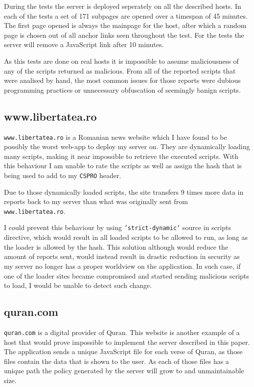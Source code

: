 \begin{description}
During the tests the server is deployed seperately on all the described hosts.
In each of the tests a set of 171 subpages are opened over a timespan of 45 minutes. 
The first page opened is always the mainpage for the host, after which a random page is chosen out of all anchor links seen throughout the test.
For the tests the server will remove a JavaScript link after 10 minutes.

As this tests are done on real hosts it is impossible to assume maliciousness of any of the scripts returned as malicious.
From all of the reported scripts that were analised by hand, the most common issues for those reports were dubious programming practices or unnecessary obfuscation of seemingly banign scripts.



\subsection{www.libertatea.ro}

\texttt{www.libertatea.ro} is a Romanian news website which I have found to be possibly the worst web-app to deploy my server on.
They are dynamically loading many scripts, making it near impossible to retrieve the executed scripts.
With this behaviour I am unable to rate the scripts as well as assign the hash that is being used to add to my \texttt{CSPRO} header.

Due to those dynamically loaded scripts, the site transfers 9 times more data in reports back to my server than what was originally sent from \texttt{www.libertatea.ro}.

I could prevent this behaviour by using \texttt{'strict-dynamic'} source in scripts directive, which would result in all loaded scripts to be allowed to run, as long as the loader is allowed by the hash.
This solution although would reduce the amount of reports sent, would instead result in drastic reduction in security as my server no longer has a proper worldview on the application.
In such case, if one of the loader sites became compromised and started sending malicious scripts to load, I would be unable to detect such change.

\subsection{quran.com}

\texttt{quran.com} is a digital provider of Quran. 
This website is another example of a host that would prove impossible to implement the server described in this paper.
The application sends a unique JavaScript file for each verse of Quran, as those files contain the data that is shown to the user.
As each of those files has a unique path the policy generated by the server will grow to and unmaintainable size.


\end{description}
